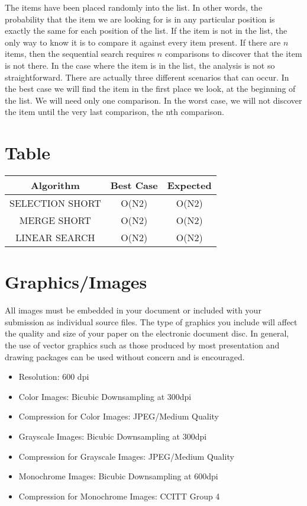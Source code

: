 \documentclass[10pt]{article}
\begin{document}
The items have been placed randomly into the list.  In other words, the probability that the item we  are  looking  for  is  in  any  particular  position  is exactly the same for each position of the list.   If the item is not in the list, the only way to know it is to compare it against every item present. If there are \(n\)  items, then  the sequential  search  requires  \(n\) comparisons to discover that the item is not there. In the case  where the item is in the list,  the analysis is not  so  straightforward.  There  are  actually  three different scenarios that can occur. In the best case we will  find the  item in  the  first  place  we  look,  at the beginning  of  the  list.  We  will  need  only  one comparison. In the worst  case, we  will not  discover the  item  until  the  very  last  comparison,  the  nth comparison.

\section{Table}

\begin{tabular}{|c|c|c|}
\hline
  Algorithm & Best Case & Expected\\
  \hline
   SELECTION SHORT & O(N2) & O(N2)\\
   \hline
   MERGE SHORT & O(N2) & O(N2)\\
   \hline
   LINEAR SEARCH & O(N2) & O(N2)\\
   \hline
\end{tabular}


\section{Graphics/Images}

All images must be embedded in your document or included with your submission as individual source files. The type of graphics you include will affect the quality and size of your paper on the electronic document disc. In general, the use of vector graphics such as those produced by most presentation and drawing packages can be used without concern and is encouraged.

\begin{itemize}
\setlength\itemsep{0em}
\item Resolution: 600 dpi
\item Color Images: Bicubic Downsampling at 300dpi
\item Compression for Color Images: JPEG/Medium Quality
\item Grayscale Images: Bicubic Downsampling at 300dpi
\item Compression for Grayscale Images: JPEG/Medium Quality
\item Monochrome Images: Bicubic Downsampling at 600dpi
\item Compression for Monochrome Images: CCITT Group 4
\end{itemize}
\end{document}
